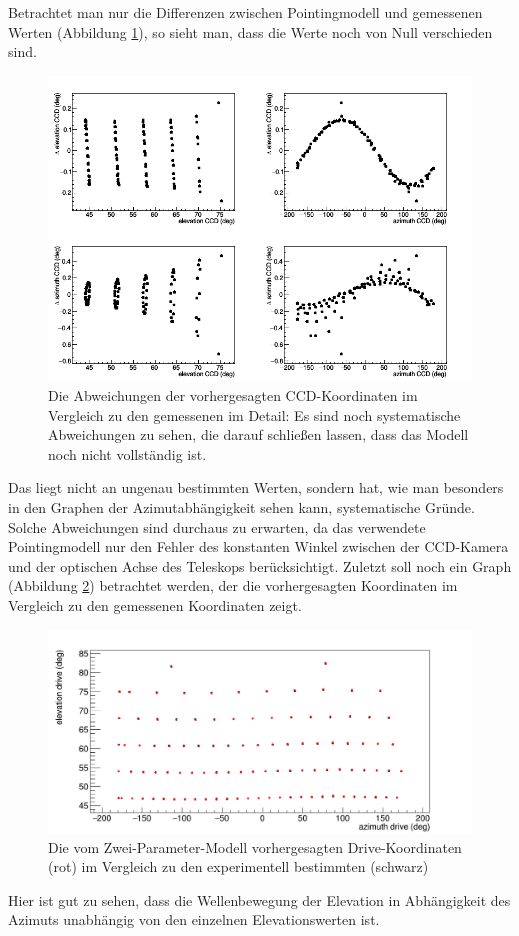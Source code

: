 Betrachtet man nur die Differenzen zwischen Pointingmodell und gemessenen Werten (Abbildung \ref{img:C2D}), so sieht man, dass die Werte noch von Null verschieden sind.
\begin{figure}[htbp]
\centering
\includegraphics[width=\textwidth]{../341/C2D.png}
\caption{Die Abweichungen der vorhergesagten CCD-Koordinaten im Vergleich zu den gemessenen im Detail: Es sind noch systematische Abweichungen zu sehen, die darauf schließen lassen, dass das Modell noch nicht vollständig ist.}
\label{img:C2D}
\end{figure}
Das liegt nicht an ungenau bestimmten Werten, sondern hat, wie man besonders in den Graphen der Azimutabhängigkeit sehen kann, systematische Gründe. Solche Abweichungen sind durchaus zu erwarten, da das verwendete Pointingmodell nur den Fehler des konstanten Winkel zwischen der CCD-Kamera und der optischen Achse des Teleskops berücksichtigt. Zuletzt soll noch ein Graph (Abbildung \ref{img:C2Dcomp2}) betrachtet werden, der die vorhergesagten Koordinaten im Vergleich zu den gemessenen Koordinaten zeigt.
\begin{figure}[htbp]
\centering
\includegraphics[width=\textwidth]{../341/C2Dcomp2.png}
\caption{Die vom Zwei-Parameter-Modell vorhergesagten Drive-Koordinaten (rot) im Vergleich zu den experimentell bestimmten (schwarz)}
\label{img:C2Dcomp2}
\end{figure}
Hier ist gut zu sehen, dass die Wellenbewegung der Elevation in Abhängigkeit des Azimuts unabhängig von den einzelnen Elevationswerten ist.
